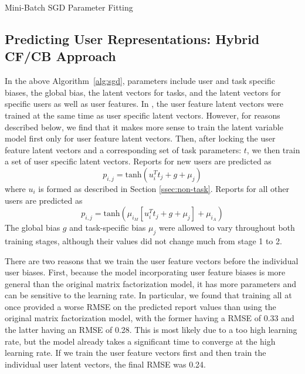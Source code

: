 \documentclass{article}
\begin{document}
\begin{algorithm}
  \begin{algorithmic}
    \ENDFOR
    \ENDFOR
  \end{algorithmic}
  \caption{Mini-Batch SGD Parameter Fitting}
  \label{alg:sgd}
\end{algorithm}

\subsection{Predicting User Representations: Hybrid CF/CB Approach}
In the above Algorithm~\ref{alg:sgd}, parameters include user and task specific biases, the global bias, the latent vectors for tasks, and the latent vectors for specific users as well as user features. In \citep{kula2015metadata}, the user feature latent vectors were trained at the same time as user specific latent vectors. However, for reasons described below, we find that it makes more sense to train the latent variable model first only for user feature latent vectors. Then, after locking the user feature latent vectors and a corresponding set of task parameters: $t$, we then train a set of user specific latent vectors. Reports for new users are predicted as $$
  p_{i,j} = \textrm{tanh}\left(u_i^{T}t_{j} + g + \mu_{j} \right)
 $$ where $u_{i}$ is formed as described in Section \ref{ssec:non-task}. Reports for all other users are predicted as $$p_{i,j} = \textrm{tanh}\left( \mu_{i_M}\left[u_{i}^{T}t_{j} + g + \mu_j\right] + \mu_{i_A}\right)$$ The global bias $g$ and task-specific bias $\mu_{j}$ were allowed to vary throughout both training stages, although their values did not change much from stage 1 to 2. 

There are two reasons that we train the user feature vectors before the individual user biases. First, because the model incorporating user feature biases is more general than the original matrix factorization model, it has more parameters and can be sensitive to the learning rate. In particular, we found that training all at once provided a worse RMSE on the predicted report values than using the original matrix factorization model, with the former having a RMSE of 0.33 and the latter having an RMSE of 0.28. This is most likely due to a too high learning rate, but the model already takes a significant time to converge at the high learning rate. If we train the user feature vectors first and then train the individual user latent vectors, the final RMSE was 0.24. 
\end{document}
